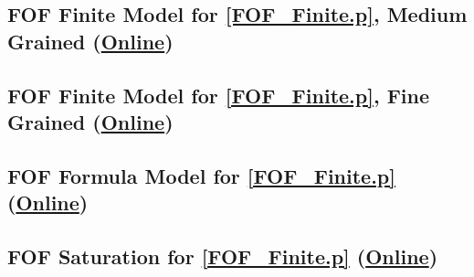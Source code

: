 \documentclass{easychair}
\begin{document}
\begin{minipage}{\textwidth}
\subsection{FOF Finite Model for \ref{FOF_Finite.p}, Medium Grained
(\href{https://raw.githubusercontent.com/GeoffsPapers/InterpretationFormat/master/Examples/FOF_Finite_Medium.s}{Online})}
\label{FOF_Finite_Medium.s}
\begin{small}

\end{small}
\end{minipage}

\begin{minipage}{\textwidth}
\subsection{FOF Finite Model for \ref{FOF_Finite.p}, Fine Grained
(\href{https://raw.githubusercontent.com/GeoffsPapers/InterpretationFormat/master/Examples/FOF_Finite_Fine.s}{Online})}
\label{FOF_Finite_Fine.s}
\begin{small}

\end{small}
\end{minipage}

\begin{minipage}{\textwidth}
\subsection{FOF Formula Model for \ref{FOF_Finite.p}
(\href{https://raw.githubusercontent.com/GeoffsPapers/InterpretationFormat/master/Examples/FOF_Formulae.s}{Online})}
\label{FOF_Formulae.s}
\begin{small}

\end{small}
\end{minipage}

\begin{minipage}{\textwidth}
\subsection{FOF Saturation for \ref{FOF_Finite.p}
(\href{https://raw.githubusercontent.com/GeoffsPapers/InterpretationFormat/master/Examples/FOF_Saturation.s}{Online})}
\label{FOF_Saturation.s}
\begin{small}

\end{small}
\end{minipage}
\end{document}
